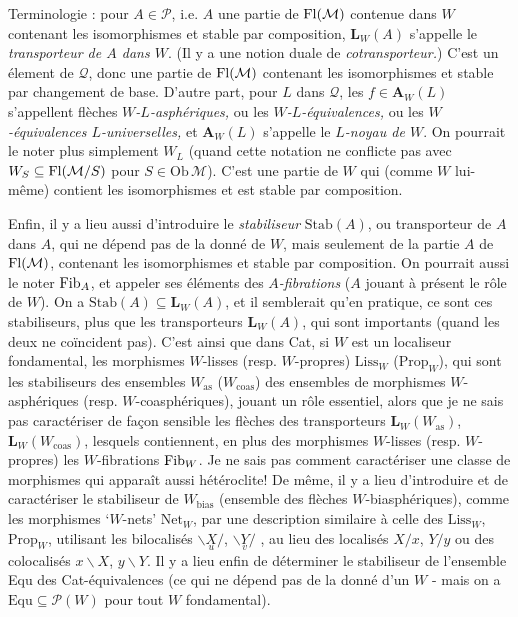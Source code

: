 Terminologie : pour $A \in \mathcal{P}$, i.e. $A$ une partie de $\mathrm{Fl}(\mathcal{M})$ contenue dans $W$ contenant les isomorphismes et stable par composition, $\mathbf{L}_W(A)$ s'appelle le \textit{transporteur de $A$ dans $W$}. (Il y a une notion duale de \textit{cotransporteur.}) C'est un élement de $\mathcal{Q}$, donc une partie de $\mathrm{Fl}(\mathcal{M})$ contenant les isomorphismes et stable par changement de base. D'autre part, pour $L$ dans $\mathcal{Q}$, les $f \in \mathbf{A}_W(L)$ s'appellent flèches \textit{$W$-$L$-asphériques,} ou les \textit{$W$-$L$-équivalences,} ou les \textit{$W$-équivalences $L$-universelles,} et $\mathbf{A}_W(L)$ s'appelle le \textit{$L$-noyau de $W$}. On pourrait le noter plus simplement $W_L$ (quand cette notation ne conflicte pas avec $W_S \subseteq \mathrm{Fl}(\mathcal{M}/S)$ pour $S \in \mathrm{Ob}\,\mathcal{M}$). C'est une partie de $W$ qui (comme $W$ lui-même) contient les isomorphismes et est stable par composition. %

Enfin, il y a lieu aussi d'introduire le \textit{stabiliseur} $\mathrm{Stab}(A)$, ou transporteur de $A$ dans $A$, qui ne dépend pas de la donné de $W$, mais seulement de la partie $A$ de $\mathrm{Fl}(\mathcal{M})$, contenant les isomorphismes et stable par composition. On pourrait aussi le noter $\mathrm{Fib}_A$, et appeler ses éléments des \textit{$A$-fibrations} ($A$ jouant à présent le rôle de $W$). On a $\mathrm{Stab}(A) \subseteq \mathbf{L}_W(A)$, et il semblerait qu'en %
pratique, ce sont ces stabiliseurs, plus que les transporteurs $\mathbf{L}_W(A)$, qui sont importants (quand les deux ne coïncident pas). C'est ainsi que dans Cat, si $W$ est un localiseur fondamental, les morphismes $W$-lisses (resp. $W$-propres) $\mathrm{Liss}_W$ ($\mathrm{Prop}_W$), qui sont les stabiliseurs des ensembles $W_{\mathrm{as}}$ ($W_{\mathrm{coas}}$) des ensembles de morphismes $W$-asphériques (resp. $W$-coasphériques), jouant un rôle essentiel, alors que je ne sais pas caractériser de façon sensible les flèches des transporteurs $\mathbf{L}_W(W_{\mathrm{as}})$, $\mathbf{L}_W(W_{\mathrm{coas}})$, lesquels contiennent, en plus des morphismes $W$-lisses (resp. $W$-propres) les $W$-fibrations $\mathrm{Fib}_W$. Je ne sais pas comment caractériser une classe de morphismes qui apparaît aussi hétéroclite! De même, il y a lieu d'introduire et de caractériser le stabiliseur de $W_{\mathrm{bias}}$ (ensemble des flèches $W$-biasphériques), comme les morphismes `$W$-nets' $\mathrm{Net}_W$, par une description similaire à celle des $\mathrm{Liss}_W$, $\mathrm{Prop}_W$, utilisant les bilocalisés $\backslash\underset{u}{X}/$, $\backslash\underset{v}{Y}/$ , au lieu des localisés $X/x$, $Y/y$ ou des colocalisés $x\backslash X$, $y\backslash Y$. Il y a lieu enfin de déterminer le stabiliseur de l'ensemble Equ des Cat-équivalences (ce qui ne dépend pas de la donné d'un $W$ - mais on a $\mathrm{Equ} \subseteq \mathcal{P}(W)$ pour tout $W$ fondamental). %

